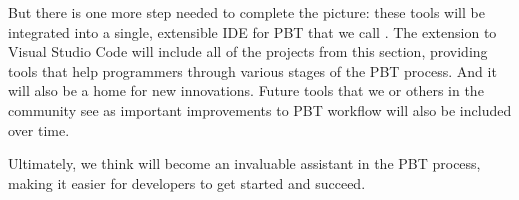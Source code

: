 But there is one more step needed to complete the picture: these tools will be
integrated into a single, extensible IDE for PBT that we call \tyche. The \tyche{}
extension to Visual Studio Code will include all of the projects from this
section, providing tools that help programmers through various stages of the PBT
process. And it will also be a home for new innovations. Future tools that we
or others in the community see as important improvements to PBT workflow will
also be included over time.

Ultimately, we think \tyche{} will become an invaluable assistant in the PBT
process, making it easier for developers to get started and succeed.
\iflater {} \fi






